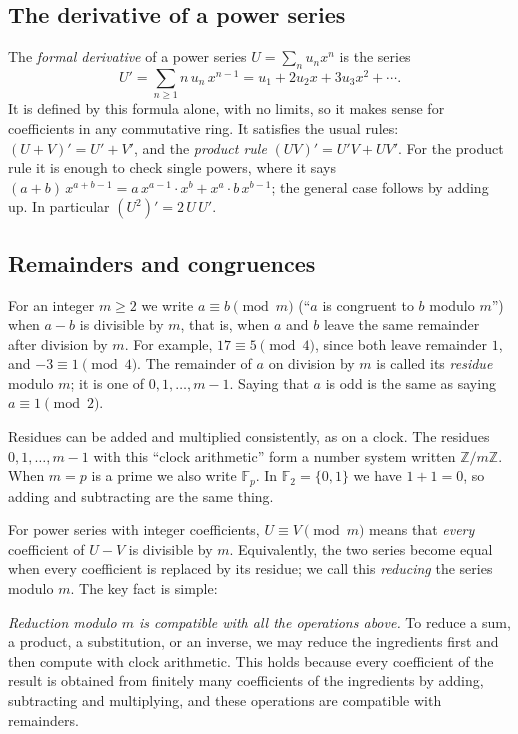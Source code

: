 \documentclass[11pt,a4paper]{article}
\theoremstyle{definition}
\theoremstyle{remark}
\newcommand{\Z}{\mathbb{Z}}
\newcommand{\F}{\mathbb{F}}
\begin{document}
\subsection{The derivative of a power series}
The \emph{formal derivative} of a power series $U=\sum_nu_nx^n$ is the series
\[
U'=\sum_{n\ge1}n\,u_n\,x^{n-1}=u_1+2u_2x+3u_3x^2+\cdots .
\]
It is defined by this formula alone, with no limits, so it makes sense for coefficients in any commutative ring. It
satisfies the usual rules: $(U+V)'=U'+V'$, and the \emph{product rule} $(UV)'=U'V+UV'$. For the product rule it is enough
to check single powers, where it says $(a+b)\,x^{a+b-1}=a\,x^{a-1}\cdot x^b+x^a\cdot b\,x^{b-1}$; the general case follows
by adding up. In particular $(U^2)'=2\,U\,U'$.

\subsection{Remainders and congruences}
For an integer $m\ge2$ we write $a\equiv b\pmod m$ (``$a$ is congruent to $b$ modulo $m$'') when $a-b$ is divisible by
$m$, that is, when $a$ and $b$ leave the same remainder after division by $m$. For example, $17\equiv5\pmod 4$, since both leave remainder $1$, and $-3\equiv1\pmod4$. The
remainder of $a$ on division by $m$ is called its \emph{residue} modulo $m$; it is one of $0,1,\dots,m-1$. Saying that
$a$ is odd is the same as saying $a\equiv1\pmod2$.

Residues can be added and multiplied consistently, as on a clock. The residues $0,1,\dots,m-1$ with this ``clock
arithmetic'' form a number system written $\Z/m\Z$. When $m=p$ is a prime we also write $\F_p$. In $\F_2=\{0,1\}$ we
have $1+1=0$, so adding and subtracting are the same thing.

For power series with integer coefficients, $U\equiv V\pmod m$ means that \emph{every} coefficient of $U-V$ is
divisible by $m$. Equivalently, the two series become equal when every coefficient is replaced by its residue; we call
this \emph{reducing} the series modulo $m$. The key fact is simple:

\emph{Reduction modulo $m$ is compatible with all the operations above.} To reduce a sum, a product, a substitution, or
an inverse, we may reduce the ingredients first and then compute with clock arithmetic. This holds because every
coefficient of the result is obtained from finitely many coefficients of the ingredients by adding, subtracting and
multiplying, and these operations are compatible with remainders.
\end{document}

